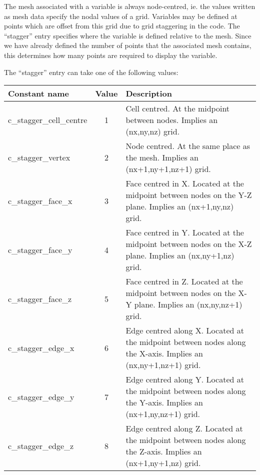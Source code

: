 \documentclass[12pt]{article}
\begin{document}
The mesh associated with a variable is always node-centred, ie. the values
written as mesh data specify the nodal values of a grid. Variables may be
defined at points which are offset from this grid due to grid staggering in
the code. The ``stagger'' entry specifies where the variable is defined
relative to the mesh. Since we have already defined the number of points
that the associated mesh contains, this determines how many points are required
to display the variable.

The ``stagger'' entry can take one of the following values:\\

\begin{center}
\begin{tabularx}{0.9\textwidth}[!hbt]{lcX}
  Constant name & Value & Description
  \\\toprule

  c\_stagger\_cell\_centre & 1 & Cell centred. At the midpoint between nodes.
  Implies an (nx,ny,nz) grid.
  \\\midrule

  c\_stagger\_vertex & 2 & Node centred. At the same place as the mesh.
  Implies an (nx+1,ny+1,nz+1) grid.
  \\\midrule

  c\_stagger\_face\_x & 3 & Face centred in X. Located at the midpoint between
  nodes on the Y-Z plane.
  Implies an (nx+1,ny,nz) grid.
  \\\midrule

  c\_stagger\_face\_y & 4 & Face centred in Y. Located at the midpoint between
  nodes on the X-Z plane.
  Implies an (nx,ny+1,nz) grid.
  \\\midrule

  c\_stagger\_face\_z & 5 & Face centred in Z. Located at the midpoint between
  nodes on the X-Y plane.
  Implies an (nx,ny,nz+1) grid.
  \\\midrule

  c\_stagger\_edge\_x & 6 & Edge centred along X. Located at the midpoint
  between nodes along the X-axis.
  Implies an (nx,ny+1,nz+1) grid.
  \\\midrule

  c\_stagger\_edge\_y & 7 & Edge centred along Y. Located at the midpoint
  between nodes along the Y-axis.
  Implies an (nx+1,ny,nz+1) grid.
  \\\midrule

  c\_stagger\_edge\_z & 8 & Edge centred along Z. Located at the midpoint
  between nodes along the Z-axis.
  Implies an (nx+1,ny+1,nz) grid.
\end{tabularx}
\end{center}\vspace{10pt}
\end{document}
